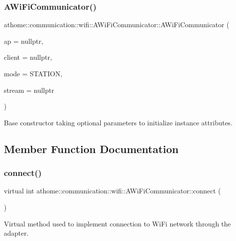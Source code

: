 \subsubsection{\texorpdfstring{A\+Wi\+Fi\+Communicator()}{AWiFiCommunicator()}}
{\footnotesize\ttfamily athome\+::communication\+::wifi\+::\+A\+Wi\+Fi\+Communicator\+::\+A\+Wi\+Fi\+Communicator (\begin{DoxyParamCaption}\item[{const \mbox{\hyperlink{structathome_1_1communication_1_1wifi_1_1s__wifi__access__point}{Wi\+Fi\+\_\+ap}} $\ast$}]{ap = {\ttfamily nullptr},  }\item[{const \mbox{\hyperlink{structathome_1_1communication_1_1wifi_1_1s__wifi__client}{Wi\+Fi\+\_\+client}} $\ast$}]{client = {\ttfamily nullptr},  }\item[{const wifi\+\_\+mode}]{mode = {\ttfamily STATION},  }\item[{Stream $\ast$}]{stream = {\ttfamily nullptr} }\end{DoxyParamCaption})}

Base constructor taking optional parameters to initialize instance attributes. 

\subsection{Member Function Documentation}
\mbox{\label{classathome_1_1communication_1_1wifi_1_1_a_wi_fi_communicator_a309927109fbc19aa0fb2afb71d50bbf9}} 
\subsubsection{\texorpdfstring{connect()}{connect()}}
{\footnotesize\ttfamily virtual int athome\+::communication\+::wifi\+::\+A\+Wi\+Fi\+Communicator\+::connect (\begin{DoxyParamCaption}{ }\end{DoxyParamCaption})\hspace{0.3cm}{\ttfamily [pure virtual]}}

Virtual method used to implement connection to Wi\+Fi network through the adapter.

